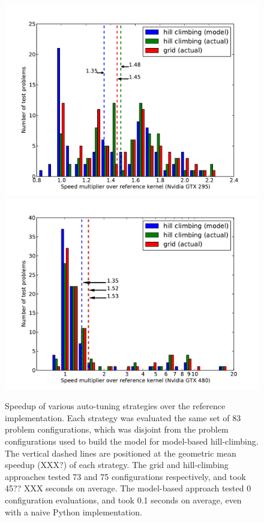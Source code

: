 \documentclass{sig-alternate}
\begin{document}
\begin{figure}
\centering
\includegraphics[scale=.42]{speedup_295.pdf}
\includegraphics[scale=.42]{speedup_480.pdf}
\caption{
Speedup of various auto-tuning strategies over the reference
implementation.  Each strategy was evaluated the same set of 83 problem
configurations, which was disjoint from the problem configurations used
to build the model for model-based hill-climbing.  The vertical dashed
lines are positioned at the geometric mean speedup (XXX?) of each
strategy. The grid and hill-climbing approaches tested 73 and 75
configurations respectively, and took 45?? XXX seconds on average.  The
model-based approach tested 0 configuration evaluations, and took 0.1
seconds on average, even with a naive Python implementation.
}
\label{fig:speedup}
\end{figure}
\end{document}
